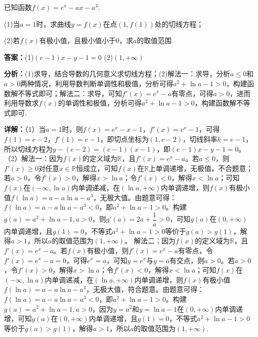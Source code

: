 \begin{question}[points=15]
已知函数$f(x)=e^x-ax-a^3$.

(1)当$a=1$时，求曲线$y=f(x)$在点$(1,f(1))$处的切线方程；

(2)若$f(x)$有极小值，且极小值小于0，求$a$的取值范围.
\begin{solution}
\textbf{答案：}(1)$(e-1)x-y-1=0$
(2)$(1,+\infty)$

\textbf{分析：}(1)求导，结合导数的几何意义求切线方程；(2)解法一：求导，分析$a\le0$和$a>0$两种情况，利用导数判断单调性和极值，分析可得$a^2+\ln a-1>0$，构建函数解不等式即可；解法二：求导，可知$f'(x)=e^x-a$有零点，可得$a>0$，进而利用导数求$f(x)$的单调性和极值，分析可得$a^2+\ln a-1>0$，构建函数解不等式即可.

\textbf{详解：}（1）当$a=1$时，则$f(x)=e^x-x-1$，$f'(x)=e^x-1$，可得$f(1)=e-2$，$f'(1)=e-1$，即切点坐标为$(1,e-2)$，切线斜率$k=e-1$，所以切线方程为$y-(e-2)=(e-1)(x-1)$，即$(e-1)x-y-1=0$。
（2）解法一：因为$f(x)$的定义域为$\mathbb{R}$，且$f'(x)=e^x-a$。若$a\le0$，则$f'(x)\ge0$对任意$x\in\mathbb{R}$恒成立，可知$f(x)$在$\mathbb{R}$上单调递增，无极值，不合题意；若$a>0$，令$f'(x)>0$，解得$x>\ln a$；令$f'(x)<0$，解得$x<\ln a$；可知$f(x)$在$(-\infty,\ln a)$内单调递减，在$(\ln a,+\infty)$内单调递增，则$f(x)$有极小值$f(\ln a)=a-a\ln a-a^3$，无极大值。由题意可得：$f(\ln a)=a-a\ln a-a^3<0$，即$a^2+\ln a-1>0$。构建$g(a)=a^2+\ln a-1,a>0$，则$g'(a)=2a+\dfrac{1}{a}>0$，可知$g(a)$在$(0,+\infty)$内单调递增，且$g(1)=0$，不等式$a^2+\ln a-1>0$等价于$g(a)>g(1)$，解得$a>1$，所以$a$的取值范围为$(1,+\infty)$。
解法二：因为$f(x)$的定义域为$\mathbb{R}$，且$f'(x)=e^x-a$。若$f(x)$有极小值，则$f'(x)=e^x-a$有零点，令$f'(x)=e^x-a=0$，可得$e^x=a$，可知$y=e^x$与$y=a$有交点，则$a>0$。若$a>0$，令$f'(x)>0$，解得$x>\ln a$；令$f'(x)<0$，解得$x<\ln a$；可知$f(x)$在$(-\infty,\ln a)$内单调递减，在$(\ln a,+\infty)$内单调递增，则$f(x)$有极小值$f(\ln a)=a-a\ln a-a^3$，无极大值，符合题意。由题意可得：$f(\ln a)=a-a\ln a-a^3<0$，即$a^2+\ln a-1>0$。构建$g(a)=a^2+\ln a-1,a>0$，因为$y=a^2$和$y=\ln a-1$在$(0,+\infty)$内单调递增，可知$g(a)$在$(0,+\infty)$内单调递增，且$g(1)=0$，不等式$a^2+\ln a-1>0$等价于$g(a)>g(1)$，解得$a>1$，所以$a$的取值范围为$(1,+\infty)$.
\end{solution}
\end{question}

